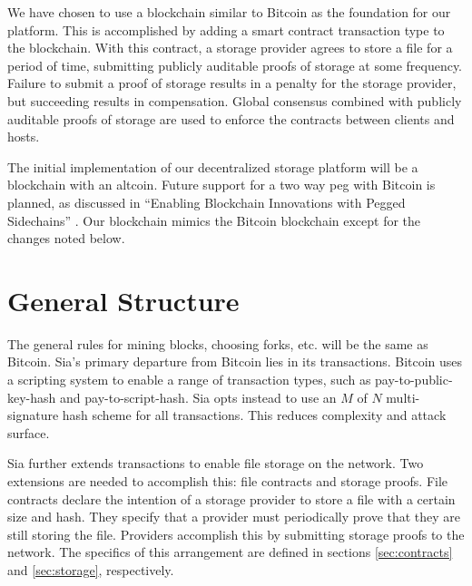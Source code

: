 \documentclass[twocolumn]{article}
\begin{document}
We have chosen to use a blockchain similar to Bitcoin \cite{btc, btcdg} as the foundation for our platform.
This is accomplished by adding a smart contract transaction type to the blockchain.
With this contract, a storage provider agrees to store a file for a period of time, submitting publicly auditable proofs of storage at some frequency.
Failure to submit a proof of storage results in a penalty for the storage provider, but succeeding results in compensation.
Global consensus combined with publicly auditable proofs of storage are used to enforce the contracts between clients and hosts.

The initial implementation of our decentralized storage platform will be a blockchain with an altcoin.
Future support for a two way peg with Bitcoin is planned, as discussed in ``Enabling Blockchain Innovations with Pegged Sidechains'' \cite{side}.
Our blockchain mimics the Bitcoin blockchain except for the changes noted below.

\section{General Structure}
The general rules for mining blocks, choosing forks, etc. will be the same as Bitcoin.
Sia's primary departure from Bitcoin lies in its transactions.
Bitcoin uses a scripting system to enable a range of transaction types, such as pay-to-public-key-hash and pay-to-script-hash.
Sia opts instead to use an $M$ of $N$ multi-signature hash scheme for all transactions.
This reduces complexity and attack surface.

Sia further extends transactions to enable file storage on the network.
Two extensions are needed to accomplish this: file contracts and storage proofs.
File contracts declare the intention of a storage provider to store a file with a certain size and hash.
They specify that a provider must periodically prove that they are still storing the file.
Providers accomplish this by submitting storage proofs to the network.
The specifics of this arrangement are defined in sections \ref{sec:contracts} and \ref{sec:storage}, respectively.
\end{document}
